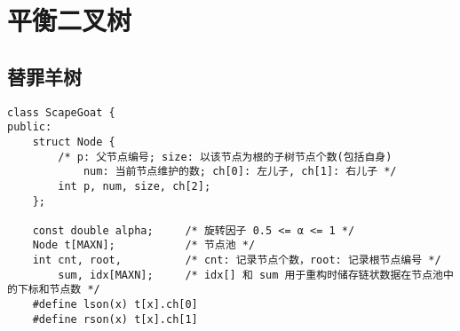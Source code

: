 \section{平衡二叉树}
\subsection{替罪羊树}
\begin{verbatim}
class ScapeGoat {
public:
    struct Node {
        /* p: 父节点编号; size: 以该节点为根的子树节点个数(包括自身)
            num: 当前节点维护的数; ch[0]: 左儿子, ch[1]: 右儿子 */
        int p, num, size, ch[2];
    };

    const double alpha;     /* 旋转因子 0.5 <= α <= 1 */
    Node t[MAXN];           /* 节点池 */
    int cnt, root,          /* cnt: 记录节点个数，root: 记录根节点编号 */
        sum, idx[MAXN];     /* idx[] 和 sum 用于重构时储存链状数据在节点池中的下标和节点数 */
    #define lson(x) t[x].ch[0]
    #define rson(x) t[x].ch[1]


\end{verbatim}
